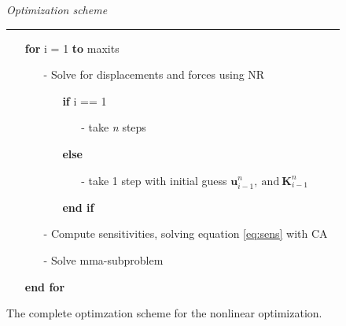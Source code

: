 \begin{minipage}[t]{0.7\textwidth}
\begin{figure}[H]
\begin{framed}
\textit{Optimization scheme}
\hrule
\begin{itemize}
    \item[] \textbf{for} i = 1  \textbf{to} maxits
    \begin{itemize}
        \item[-] Solve for displacements and forces using NR
        \begin{itemize}
            \item[] \textbf{if} i == 1
            \begin{itemize}
                \item[-] take \textit{n} steps
            \end{itemize}
            \item[] \textbf{else}
            \begin{itemize}
                \item[-] take 1 step with initial guess $\bm u_{i - 1}^{n}, \ \text{and} \ \bm K_{i - 1}^{n}$
            \end{itemize} 
            \item[] \textbf{end if}
        \end{itemize}
        \item[-] Compute sensitivities, solving equation \ref{eq:sens} with CA
        \item[-] Solve mma-subproblem
    \end{itemize}
    \item[] \textbf{end for}
\end{itemize}
\end{framed}
\caption{The complete optimzation scheme for the nonlinear optimization.}
\end{figure}
\end{minipage}\\

